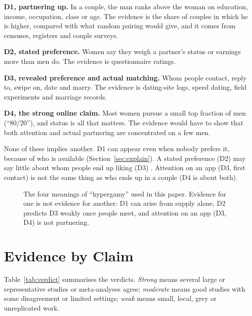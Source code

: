 \documentclass[conference,a4paper]{IEEEtran}
\begin{document}
\textbf{D1, partnering up.} In a couple, the man ranks above the woman on education, income, occupation, class or age. The evidence is the share of couples in which he is higher, compared with what random pairing would give, and it comes from censuses, registers and couple surveys.

\textbf{D2, stated preference.} Women say they weigh a partner's status or earnings more than men do. The evidence is questionnaire ratings.

\textbf{D3, revealed preference and actual matching.} Whom people contact, reply to, swipe on, date and marry. The evidence is dating-site logs, speed dating, field experiments and marriage records.

\textbf{D4, the strong online claim.} Most women pursue a small top fraction of men (``80/20''), and status is all that matters. The evidence would have to show that both attention and actual partnering are concentrated on a few men.

None of these implies another. D1 can appear even when nobody prefers it, because of who is available (Section~\ref{sec:explain}). A stated preference (D2) may say little about whom people end up liking (D3) \cite{eastwick2008,eastwick2014}. Attention on an app (D3, first contact) is not the same thing as who ends up in a couple (D4 is about both).

\begin{figure}[t]
\centering

\caption{The four meanings of ``hypergamy'' used in this paper. Evidence for one is not evidence for another: D1 can arise from supply alone, D2 predicts D3 weakly once people meet, and attention on an app (D3, D4) is not partnering.}
\label{fig:concept}
\end{figure}

\section{Evidence by Claim}
\label{sec:evidence}
Table~\ref{tab:verdict} summarises the verdicts. \emph{Strong} means several large or representative studies or meta-analyses agree; \emph{moderate} means good studies with some disagreement or limited settings; \emph{weak} means small, local, grey or unreplicated work.
\end{document}
